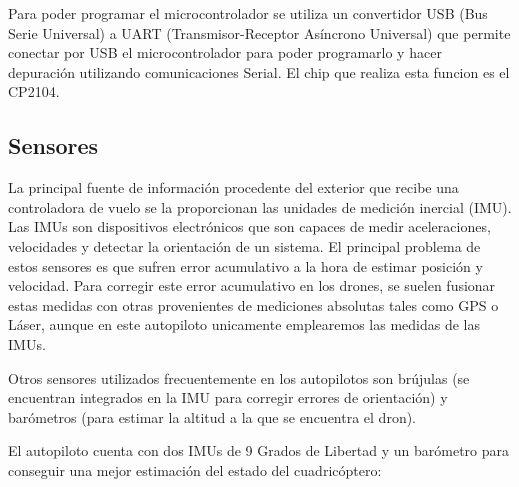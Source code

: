 \par Para poder programar el microcontrolador se utiliza un convertidor USB (Bus Serie Universal) a UART (Transmisor-Receptor Asíncrono Universal) que permite conectar por USB el microcontrolador para poder programarlo y hacer depuración utilizando comunicaciones Serial. El chip que realiza esta funcion es el CP2104.

\subsection{Sensores}
La principal fuente de información procedente del exterior que recibe una controladora de vuelo se la proporcionan las unidades de medición inercial (IMU). Las IMUs son dispositivos electrónicos que son capaces de medir aceleraciones, velocidades y detectar la orientación de un sistema. El principal problema de estos sensores es que sufren error acumulativo a la hora de estimar posición y velocidad. Para corregir este error acumulativo en los drones, se suelen fusionar estas medidas con otras provenientes de mediciones absolutas tales como GPS o Láser, aunque en este autopiloto unicamente emplearemos las medidas de las IMUs.

\par Otros sensores utilizados frecuentemente en los autopilotos son brújulas (se encuentran integrados en la IMU para corregir errores de orientación) y barómetros (para estimar la altitud a la que se encuentra el dron).\\
\medskip

El autopiloto cuenta con dos IMUs de 9 Grados de Libertad y un barómetro para conseguir una mejor estimación del estado del cuadricóptero:

